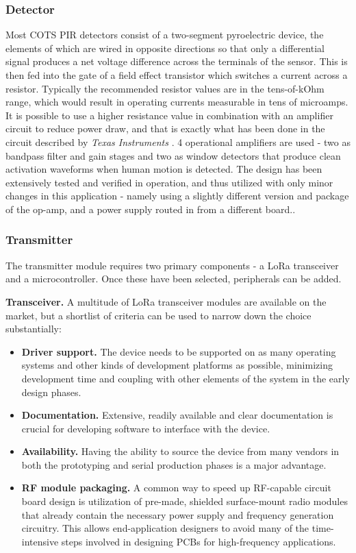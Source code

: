 \documentclass[10pt,nocopyrightspace]{ewsn-proc}
\begin{document}
\subsubsection{Detector}
Most COTS PIR detectors consist of a two-segment pyroelectric device, the elements of which are wired in opposite directions so that only a differential signal produces a net voltage difference across the terminals of the sensor. This is then fed into the gate of a field effect transistor which switches a current across a resistor. Typically the recommended resistor values are in the tens-of-kOhm range, which would result in operating currents measurable in tens of microamps. It is possible to use a higher resistance value in combination with an amplifier circuit to reduce power draw, and that is exactly what has been done in the circuit described by \textit{Texas Instruments} \cite{TI:PIR, TI:APP}. 4 operational amplifiers are used - two as bandpass filter and gain stages and two as window detectors that produce clean activation waveforms when human motion is detected. The design has been extensively tested and verified in operation, and thus utilized with only minor changes in this application - namely using a slightly different version and package of the op-amp, and a power supply routed in from a different board.. 

\subsubsection{Transmitter}
The transmitter module requires two primary components - a LoRa transceiver and a microcontroller. Once these have been selected, peripherals can be added.

\textbf{Transceiver.} A multitude of LoRa transceiver modules are available on the market, but a shortlist of criteria can be used to narrow down the choice substantially:
\begin{itemize}
\item \textbf{Driver support.} The device needs to be supported on as many operating systems and other kinds of development platforms as possible, minimizing development time and coupling with other elements of the system in the early design phases.
\item \textbf{Documentation.}  Extensive, readily available and clear documentation is crucial for developing software to interface with the device.
\item \textbf{Availability.}  Having the ability to source the device from many vendors in both the prototyping and serial production phases is a major advantage.
\item \textbf{RF module packaging.} A common way to speed up RF-capable circuit board design is utilization of pre-made, shielded surface-mount radio modules that already contain the necessary power supply and frequency generation circuitry. This allows end-application designers to avoid many of the time-intensive steps involved in designing PCBs for high-frequency applications.
\end{itemize}
\end{document}
